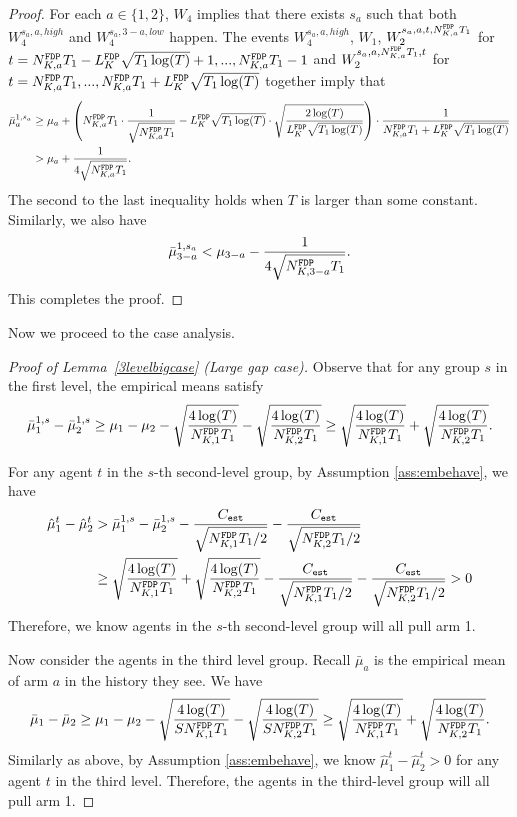 \begin{proof}%
  For each $a \in \{1,2\}$, $W_4$ implies that there exists $s_a$ such
  that both $W_4^{s_a,a,high}$ and $W_4^{s_a,3-a,low}$ happen.  The
  events $W_4^{s_a,a,high}$, $W_1$, $W_2^{s_a,a,t, \fdpN T_1}$
  for $t = \fdpN T_1- \GdT \sqrt{T_1\log(T)}+1, ...,\fdpN T_1-1$ and
  $W_2^{s_a,a,\fdpN T_1,t}$ for
  $t= \fdpN T_1,...,\fdpN T_1+ \GdT \sqrt{T_1\log(T)}$ together imply that
\begin{align*}
\bar{\mu}_a ^{1,s_a} &\geq \mu_a + \left(\fdpN T_1 \cdot \frac{1}{\sqrt{\fdpN T_1}} - \GdT \sqrt{T_1\log(T)} \cdot \sqrt{\frac{2\log(T)}{ \GdT \sqrt{T_1\log(T)}}} \right) \cdot \frac{1}{\fdpN T_1+ \GdT \sqrt{T_1\log(T)}} \\
&> \mu_a + \frac{1}{4\sqrt{\fdpN T_1}}.
\end{align*}
The second to the last inequality holds when $T$ is larger than some constant.
Similarly, we also have
\[
\bar{\mu}_{3-a} ^{1,s_a} < \mu_{3-a}   - \frac{1}{4\sqrt{\fdpN[3-a] T_1}}.
\]
This completes the proof.
\end{proof}


Now we proceed to the case analysis.


\begin{proof}[Proof of Lemma~\ref{3levelbigcase} (Large gap case)]
  Observe that for any group $s$ in the first level, the empirical
  means satisfy
\[
\bar{\mu}_1^{1,s} - \bar{\mu}_2^{1,s} \geq \mu_1 -\mu_2 - \sqrt{\frac{4\log(T)}{\fdpN[1]T_1}} - \sqrt{\frac{4\log(T)}{\fdpN[2]T_1}} \geq  \sqrt{\frac{4\log(T)}{\fdpN[1]T_1}} + \sqrt{\frac{4\log(T)}{\fdpN[2]T_1}}.
\]


For any agent $t$ in the $s$-th second-level group, by Assumption \ref{ass:embehave}, we have
\begin{align*}
\hat{\mu}_1^t - \hat{\mu}_2^t &>\bar{\mu}_1^{1,s} - \bar{\mu}_2^{1,s} - \frac{\estC}{\sqrt{\fdpN[1]T_1/2}} - \frac{\estC}{\sqrt{\fdpN[2]T_1/2}}\\
&\geq  \sqrt{\frac{4\log(T)}{\fdpN[1]T_1}} + \sqrt{\frac{4\log(T)}{\fdpN[2]T_1}}- \frac{\estC}{\sqrt{\fdpN[1]T_1/2}} - \frac{\estC}{\sqrt{\fdpN[2]T_1/2}} > 0
\end{align*}
Therefore, we know agents in the $s$-th second-level group will all pull arm 1.

Now consider the agents in the third level group. Recall $\bar{\mu}_a$
is the empirical mean of arm $a$ in the history they see. We have
\[
\bar{\mu}_1 - \bar{\mu}_2 \geq \mu_1 -\mu_2 - \sqrt{\frac{4\log(T)}{S\fdpN[1]T_1}} - \sqrt{\frac{4\log(T)}{S\fdpN[2]T_1}} \geq  \sqrt{\frac{4\log(T)}{\fdpN[1]T_1}}
+ \sqrt{\frac{4\log(T)}{\fdpN[2]T_1}}.
\]
Similarly as above, by Assumption \ref{ass:embehave}, we know
$\hat{\mu}_1^t - \hat{\mu}_2^t > 0$ for any agent $t$ in the third
level. Therefore, the agents in the third-level group will all pull
arm 1.  
\end{proof}


